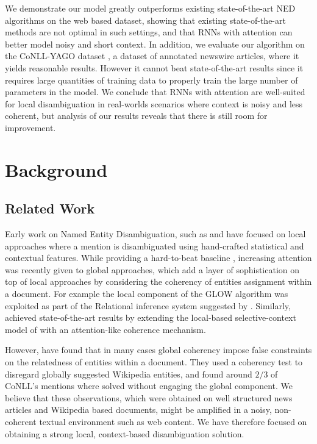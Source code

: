 \documentclass[11pt]{article}
\begin{document}
We demonstrate our model greatly outperforms existing state-of-the-art NED algorithms on the web based dataset, showing that existing state-of-the-art methods are not optimal in such settings, and that RNNs with attention can better model noisy and short context. In addition, we evaluate our algorithm on the CoNLL-YAGO dataset \cite{hoffart2011robust}, a dataset of annotated newswire articles, where it yields reasonable results. However it cannot beat state-of-the-art results since it requires large quantities of training data to properly train the large number of parameters in the model. We conclude that RNNs with attention are well-suited for local disambiguation in real-worlds scenarios where context is noisy and less coherent, but analysis of our results reveals that there is still room for improvement.

\section{Background}

\subsection{Related Work}

Early work on Named Entity Disambiguation, such as  and  have focused on local approaches where a mention is disambiguated using hand-crafted statistical and contextual features. While providing a hard-to-beat baseline \cite{Ratinov2011}, increasing attention was recently given to global approaches, which add a layer of sophistication on top of local approaches by considering the coherency of entities assignment within a document. For example the local component of the GLOW algorithm \cite{Ratinov2011} was exploited as part of the Relational inference system suggested by . Similarly,  achieved state-of-the-art results by extending the local-based selective-context model of  with an attention-like coherence mechanism.

However,  have found that in many cases global coherency impose false constraints on the relatedness of entities within a document. They used a coherency test to disregard globally suggested Wikipedia entities, and found around $2/3$ of CoNLL's mentions where solved without engaging the global component. We believe that these observations, which were obtained on well structured news articles and Wikipedia based documents, might be amplified in a noisy, non-coherent textual environment such as web content. We have therefore focused on obtaining a strong local, context-based disambiguation solution.
\end{document}
